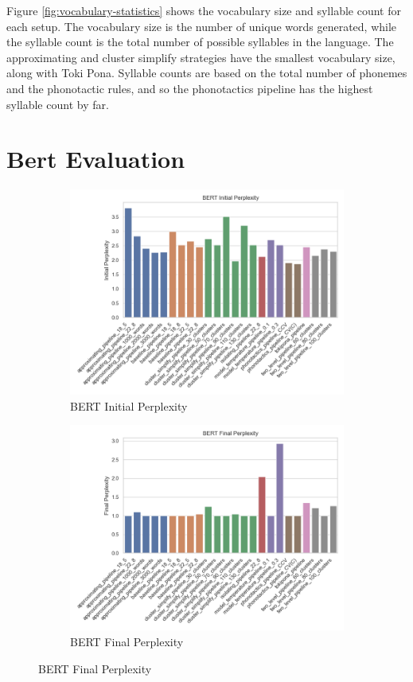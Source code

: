 Figure \ref{fig:vocabulary-statistics} shows the vocabulary size and syllable count for each setup. 
The vocabulary size is the number of unique words generated, while the syllable count is the total number of possible syllables in the language. 
The approximating and cluster simplify strategies have the smallest vocabulary size, along with Toki Pona. Syllable counts are based on the total number of phonemes and 
the phonotactic rules, and so the phonotactics pipeline has the highest syllable count by far.

\section{Bert Evaluation}

\begin{figure}[H]  
    \centering
    \begin{subfigure}[b]{0.48\linewidth}
        \includegraphics[width=0.7\linewidth]{figures/results/bert_initial_perplexity.png}
        \caption{BERT Initial Perplexity}
        \label{fig:bert-initial-perplexity}
    \end{subfigure}
    \hfill
    \begin{subfigure}[b]{0.48\linewidth}
        \includegraphics[width=0.7\linewidth]{figures/results/bert_final_perplexity.png}
        \caption{BERT Final Perplexity}
        \label{fig:bert-final-perplexity}
    \end{subfigure}
    

\end{figure}
